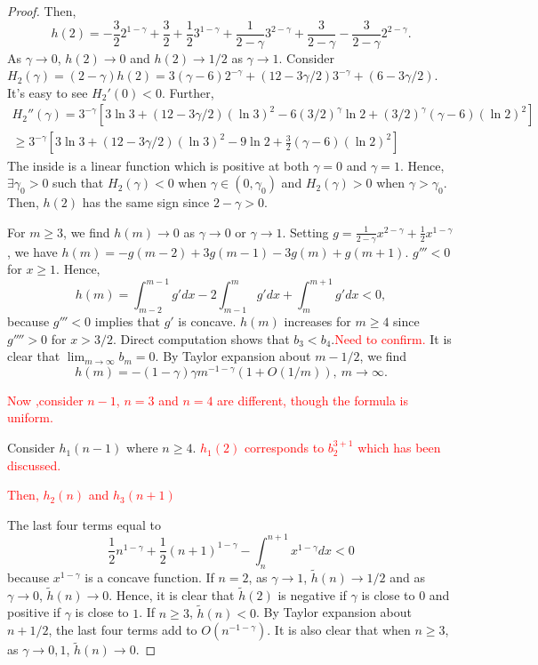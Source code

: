 \documentclass[11pt]{article} %
\newcommand{\tcr}[1]{\textcolor{red}{#1}}
\begin{document}
\begin{proof}
Then, $$
h(2)=-\frac{3}{2}2^{1-\gamma}+\frac{3}{2}+\frac{1}{2}3^{1-\gamma}
+\frac{1}{2-\gamma}3^{2-\gamma}
+\frac{3}{2-\gamma}-\frac{3}{2-\gamma}2^{2-\gamma}.
$$
As $\gamma\to 0$, $h(2)\to 0$ and $h(2)\to 1/2$ as $\gamma\to 1$. 
Consider $H_2(\gamma)=(2-\gamma)h(2)=3(\gamma-6)2^{-\gamma}+(12-3\gamma/2)3^{-\gamma}
+(6-3\gamma/2)$. It's easy to see $H_2'(0)<0$. Further, 
\begin{multline*}
H_2''(\gamma)=3^{-\gamma}[3\ln 3+(12-3\gamma/2)(\ln 3)^2
-6(3/2)^{\gamma}\ln 2+(3/2)^{\gamma}(\gamma-6)(\ln 2)^2]\\
\ge 3^{-\gamma}[3\ln 3+(12-3\gamma/2)(\ln 3)^2
-9\ln 2+\frac{3}{2}(\gamma-6)(\ln 2)^2]
\end{multline*}
The inside is a linear function which is positive at both $\gamma=0$ and $\gamma=1$. Hence, $\exists \gamma_0>0$ such that $H_2(\gamma)<0$ when $\gamma\in(0,\gamma_0)$ and $H_2(\gamma)>0$ when $\gamma>\gamma_0$. Then, $h(2)$ has the same sign since $2-\gamma>0$.

For $m\ge 3$, we find $h(m)\to 0$ as $\gamma\to 0$ or $\gamma\to 1$. Setting $g=\frac{1}{2-\gamma}x^{2-\gamma}+\frac{1}{2}x^{1-\gamma}$, we have
$h(m)=-g(m-2)+3g(m-1)-3g(m)+g(m+1)$. $g'''<0$ for $x\ge 1$. Hence, $$
h(m)=\int_{m-2}^{m-1}g' dx-2\int_{m-1}^{m}g' dx
+\int_{m}^{m+1}g' dx<0,
$$
because $g'''<0$ implies that $g'$ is concave. $h(m)$ increases for $m\ge 4$ since $g''''>0$ for $x>3/2$. 
Direct computation shows that $b_3<b_4$.\tcr{Need to confirm.}
It is clear that $\lim_{m\to\infty}b_m=0$. By Taylor expansion about $m-1/2$, we find $$
h(m)=-(1-\gamma)\gamma m^{-1-\gamma}(1+O(1/m)),\ m\to\infty.
$$

\tcr{Now ,consider $n-1$, $n=3$ and $n=4$ are different, though the formula is uniform.}

Consider $h_1(n-1)$ where $n\ge 4$. \tcr{$h_1(2)$ corresponds to $b_2^{3+1}$ which has been discussed.}


\tcr{Then, $h_2(n)$ and $h_3(n+1)$}

The last four terms equal to $$
\frac{1}{2}n^{1-\gamma}+\frac{1}{2}(n+1)^{1-\gamma}
-\int_n^{n+1}x^{1-\gamma}dx<0
$$
because $x^{1-\gamma}$ is a concave function. 
If $n=2$, as $\gamma\to 1$, $\tilde{h}(n)\to 1/2$ and as $\gamma\to 0$, $\tilde{h}(n)\to 0$. Hence, it is clear that $\tilde{h}(2)$ is negative if $\gamma$ is close to $0$ and positive if $\gamma$ is close to $1$. 
If $n\ge 3$, $\tilde{h}(n)<0$. By Taylor expansion about $n+1/2$, the last four terms add to $O(n^{-1-\gamma})$. It is also clear that when $n\ge 3$, as $\gamma\to 0,1$, $\tilde{h}(n)\to 0$. 


\end{proof}
\end{document}
